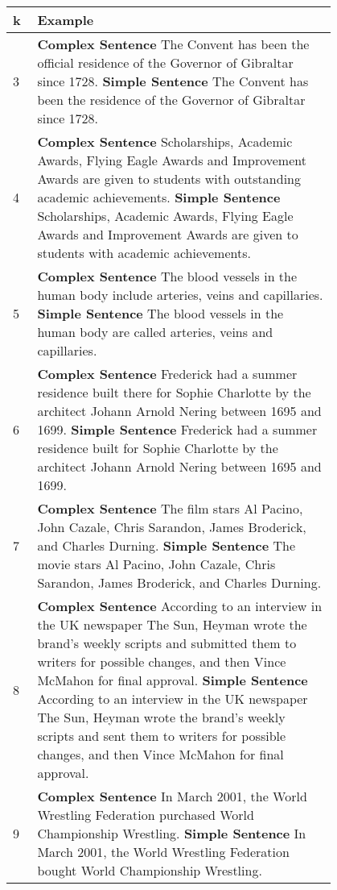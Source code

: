 \documentclass[11pt]{article}
\begin{document}
\begin{table*}[htbp]
\centering
\small
\renewcommand{\arraystretch}{1.5}
\begin{tabular}{p{0.05\linewidth} p{0.75\linewidth}} \toprule
k & Example \\ \midrule
3 & \textbf{Complex Sentence} The Convent has been the official residence of the Governor of Gibraltar since 1728. \newline \textbf{Simple Sentence} The Convent has been the residence of the Governor of Gibraltar since 1728.\\
\midrule
4 & \textbf{Complex Sentence} Scholarships, Academic Awards, Flying Eagle Awards and Improvement Awards are given to students with outstanding academic achievements. \newline \textbf{Simple Sentence} Scholarships, Academic Awards, Flying Eagle Awards and Improvement Awards are given to students with academic achievements.\\
\midrule
5 & \textbf{Complex Sentence} The blood vessels in the human body include arteries, veins and capillaries. \newline \textbf{Simple Sentence} The blood vessels in the human body are called arteries, veins and capillaries.\\
\midrule
6 & \textbf{Complex Sentence} Frederick had a summer residence built there for Sophie Charlotte by the architect Johann Arnold Nering between 1695 and 1699. \newline \textbf{Simple Sentence} Frederick had a summer residence built for Sophie Charlotte by the architect Johann Arnold Nering between 1695 and 1699.\\
\midrule
7 & \textbf{Complex Sentence} The film stars Al Pacino, John Cazale, Chris Sarandon, James Broderick, and Charles Durning. \newline \textbf{Simple Sentence} The movie stars Al Pacino, John Cazale, Chris Sarandon, James Broderick, and Charles Durning.\\
\midrule
8 & \textbf{Complex Sentence} According to an interview in the UK newspaper The Sun, Heyman wrote the brand's weekly scripts and submitted them to writers for possible changes, and then Vince McMahon for final approval. \newline \textbf{Simple Sentence} According to an interview in the UK newspaper The Sun, Heyman wrote the brand's weekly scripts and sent them to writers for possible changes, and then Vince McMahon for final approval.\\
\midrule
9 & \textbf{Complex Sentence} In March 2001, the World Wrestling Federation purchased World Championship Wrestling. \newline \textbf{Simple Sentence} In March 2001, the World Wrestling Federation bought World Championship Wrestling.\\

\end{tabular}
\end{table*}
\end{document}
